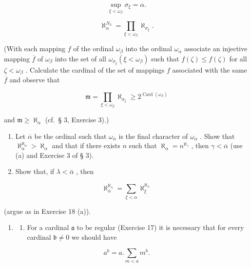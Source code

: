 \[
\sup _ {\xi <   \omega_ {\beta}} \sigma_ {\xi} = \alpha .
\]

\[
\aleph_ {\alpha} ^ {N _ {3}} = \prod_ {\xi <   \omega_ {\beta}} \aleph_ {\sigma_ {\xi}}.
\]

(With each mapping \(f\) of the ordinal \(\omega_{\beta}\) into the ordinal \(\omega_{\alpha}\) associate an injective mapping \(\overline{f}\) of \(\omega_{\beta}\) into the set of all \(\omega_{\sigma_{\xi}}(\xi < \omega_{\beta})\) such that \(f(\zeta) \leqslant f(\zeta)\) for all \(\zeta < \omega_{\beta}\) . Calculate the cardinal of the set of mappings \(f\) associated with the same \(\overline{f}\) and observe that

\[
\mathfrak {m} = \prod_ {\xi <   \omega_ {\beta}} \aleph_ {\sigma_ {\xi}} \geqslant 2 ^ {\operatorname{Card} (\omega_ {\beta})}
\]

and \(\mathfrak{m} \geqslant \aleph_{\alpha}\) (cf.~§ 3, Exercise 3).)

\begin{enumerate}
\def\labelenumi{(\alph{enumi})}
\setcounter{enumi}{1}
\item
  Let \(\overline{\alpha}\) be the ordinal such that \(\omega_{\overline{\alpha}}\) is the final character of \(\omega_{\alpha}\) . Show that \(\aleph_{\alpha}^{\aleph_{\overline{\alpha}}} > \aleph_{\alpha}\) and that if there exists \(n\) such that \(\aleph_{\alpha} = n^{\aleph_{\gamma}}\) , then \(\gamma < \overline{\alpha}\) (use (a) and Exercise 3 of § 3).
\item
  Show that, if \(\lambda < \bar{\alpha}\) , then
\end{enumerate}

\[
\aleph_ {\alpha} ^ {\aleph_ {\lambda}} = \sum_ {\xi <   \alpha} \aleph_ {\xi} ^ {\aleph_ {\lambda}}
\]

(argue as in Exercise 18 (a)).

\begin{enumerate}
\def\labelenumi{\arabic{enumi}.}
\setcounter{enumi}{19}
\tightlist
\item
  \begin{enumerate}
  \def\labelenumii{(\alph{enumii})}
  \tightlist
  \item
    For a cardinal \(\mathfrak{a}\) to be regular (Exercise 17) it is necessary that for every cardinal \(\mathfrak{b} \neq 0\) we should have
  \end{enumerate}
\end{enumerate}

\[
a ^ {b} = a. \sum_ {m <   a} m ^ {b}.
\]

